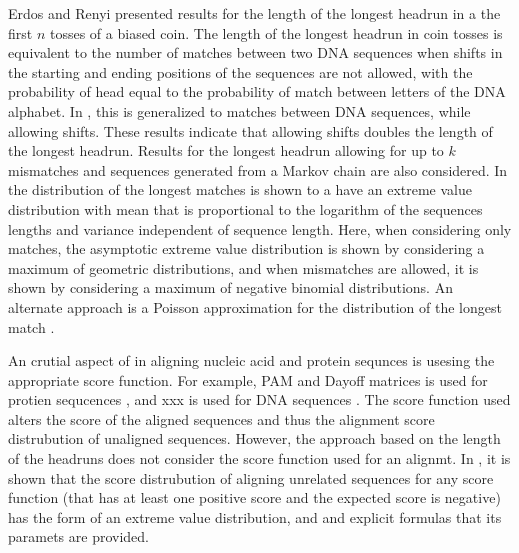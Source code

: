 Erdos and Renyi \cite{erdos1975length} presented results for the length
of the longest headrun in a the first $n$ tosses of a biased coin.  The
length of the longest headrun in coin tosses is equivalent to the number
of matches between two DNA sequences when shifts in the starting and
ending positions of the sequences are not allowed, with the probability
of head equal to the probability of match between letters of the DNA
alphabet.
In \cite{arratia1985erdos}, this is generalized to matches between DNA
sequences, while allowing shifts. These results indicate that allowing
shifts doubles the length of the longest headrun. Results for the
longest headrun allowing for up to $k$ mismatches and sequences
generated from a Markov chain are also considered.
In \cite{arratia1986extreme,gordon1986extreme} the distribution of the
longest matches is shown to a have an extreme value distribution with
mean that is proportional to the logarithm of the sequences lengths and
variance independent of sequence length. Here, when considering only
matches, the asymptotic extreme value distribution is shown by
considering a maximum of geometric distributions, and when mismatches
are allowed, it is shown by considering a maximum of negative binomial
distributions.
An alternate approach is a Poisson approximation for the distribution of
the longest match \cite{arratia1989erdos}.

An crutial aspect of in aligning nucleic acid and protein sequnces is
usesing the appropriate score function. For example, PAM and Dayoff
matrices is used for protien sequcences \cite{}, and xxx is used for DNA
sequences \cite{}.  The score function used alters the score of the
aligned sequences and thus the alignment score distrubution of unaligned
sequences.
However, the approach based on the length of the headruns does not
consider the score function used for an alignmt.
%
In \cite{}, it is shown that the score distrubution of aligning
unrelated sequences for any score function (that has at least one
positive score and the expected score is negative) has the form of an
extreme value distribution, and and explicit formulas that its paramets
are provided.





